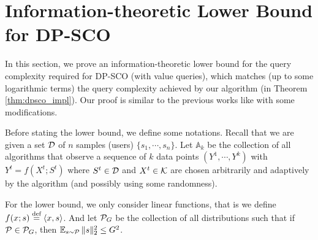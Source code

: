 \section{Information-theoretic Lower Bound for DP-SCO}
\label{sec:infolower}

 In this section, we prove an information-theoretic lower bound for the query complexity required for DP-SCO (with value queries), which matches (up to some logarithmic terms) the query complexity achieved by our algorithm (in Theorem \ref{thm:dpsco_impl}).
Our proof is similar to the previous works like \cite{ACCD12,DJWW15} with some modifications.



Before stating the lower bound, we define some notations.
Recall that we are given a set $\mathcal D$ of $n$ samples (users) $\{s_1,\cdots,s_n\}$.
Let $\mathbb{A}_k$ be the collection of all algorithms that observe a sequence of $k$ data points $(Y^1,\cdots,Y^k)$ with $Y^t=f(X^t;S^t)$ where %
$S^t\in \mathcal D$ and $X^t\in \mathcal K$ are chosen arbitrarily and adaptively by the algorithm (and possibly using some randomness).

For the lower bound, we only consider linear functions, that is we define $f(x;s)\stackrel{{\text{def}}}{=}\langle x,s\rangle$. And let $\mathcal P_G$ be the collection of all distributions such that if $\mathcal P\in\mathcal P_G$, then $\operatorname*{\mathbb{E}}_{s\sim\mathcal P}\|s\|_2^2\leq G^2$.


